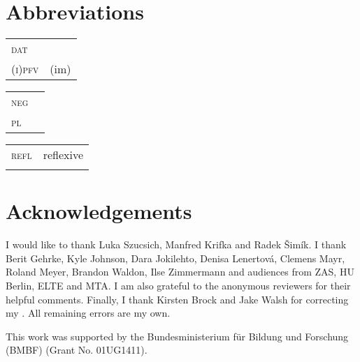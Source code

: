 \documentclass[output=paper,  modfonts,  newtxmath,  hidelinks		  ]{langscibook}
\begin{document}
\section*{Abbreviations}
\begin{tabularx}{.333\textwidth}{@{}lQ@{}}
\textsc{dat} &  \\
\textsc{(i)pfv} & (im)\\
\end{tabularx}%
\begin{tabularx}{.333\textwidth}{@{}lQ@{}}
\textsc{neg} & \\
\textsc{pl}&\\
\end{tabularx}%
\begin{tabularx}{.333\textwidth}{@{}lQ@{}}
\textsc{refl}&reflexive\\
{}&{}\\
\end{tabularx}

 \section*{Acknowledgements}
I would like to thank Luka Szucsich, Manfred Krifka and Radek \v{S}imík. I thank Berit Gehrke, Kyle Johnson, Dara Jokilehto, Denisa Lenertová, Clemens Mayr, Roland Meyer, Brandon Waldon, Ilse Zimmermann and audiences from ZAS, HU Berlin, ELTE and MTA. I am also grateful to the anonymous reviewers for their helpful comments. Finally, I thank Kirsten Brock and Jake Walsh for correcting my . All remaining errors are my own.

This work was supported by the  Bundesministerium für Bildung und Forschung (BMBF) (Grant No. 01UG1411).

\sloppy
\printbibliography[heading=subbibliography,notkeyword=this]
\end{document}
